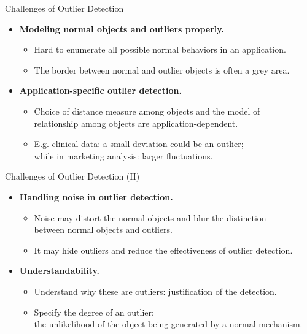 \begin{frame}{Challenges of Outlier Detection}
  \begin{itemize}
  \item \textbf{Modeling normal objects and outliers properly.}
    \begin{itemize}
    \item Hard to enumerate all possible normal behaviors in an application.
    \item The border between normal and outlier objects is often a grey area.
    \end{itemize}
  \item \textbf{Application-specific outlier detection.}
    \begin{itemize}
    \item Choice of distance measure among objects and the model of \\
      relationship among objects are application-dependent.
    \item E.g. clinical data: a small deviation could be an outlier; \\
      while in marketing analysis: larger fluctuations.
    \end{itemize}
  \end{itemize}
\end{frame}


\begin{frame}{Challenges of Outlier Detection (II)}
  \begin{itemize}
  \item \textbf{Handling noise in outlier detection.}
    \begin{itemize}
    \item Noise may distort the normal objects and blur the distinction \\
      between normal objects and outliers.
    \item It may hide outliers and reduce the effectiveness of outlier detection.
    \end{itemize}
  \item \textbf{Understandability.}
    \begin{itemize}
    \item Understand why these are outliers: justification of the detection.
    \item Specify the degree of an outlier: \\
      the unlikelihood of the object being generated by a normal mechanism.
    \end{itemize}
  \end{itemize}
\end{frame}
